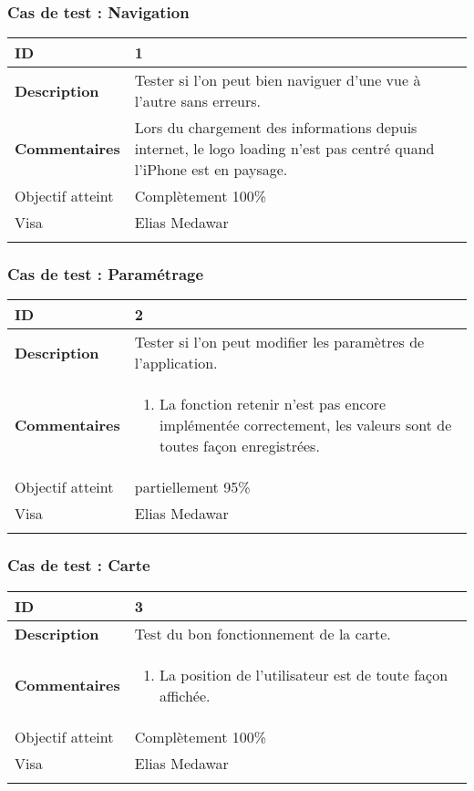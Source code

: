 		 		\subsubsection*{Cas de test : Navigation}
		 				 \begin{longtable}{m{4cm}|p{10cm}|}
		 				 \textbf{ ID} & 1 \\
		 				 \hline \textbf{Description} & Tester si l'on peut bien naviguer d'une vue à l'autre sans erreurs.\\
		 				 \hline \textbf{Commentaires} &Lors du chargement des informations depuis internet, le logo loading n'est pas centré quand l'iPhone		 est en paysage. \\
		 				 \hline Objectif  atteint & {\color{green} Complètement 100\% \CheckedBox } \\
		 				\hline Visa & Elias Medawar \\	
		 				 \\
		 			 \end{longtable} 
		  		\subsubsection*{Cas de test : Paramétrage}
		 		 \begin{longtable}{m{4cm}|p{10cm}|}
		 		 \textbf{ ID} & 2 \\
		 		 \hline \textbf{Description} & Tester si l'on peut modifier les paramètres de l'application.\\
		 		 \hline \textbf{Commentaires} & 
		 		 	 	 \begin{enumerate}
		 				  		\item La fonction retenir n'est pas encore implémentée correctement, les valeurs sont de toutes façon enregistrées.
		 				  	\end{enumerate} \\
		  				\hline Objectif atteint &  {\color{orange}partiellement 95\% \XBox} \\
		  				\hline Visa & Elias Medawar 	\\
		 		 \\
		 		  \end{longtable} 		 		 
		 		 \subsubsection*{Cas de test : Carte}
		 		 		 \begin{longtable}{m{4cm}|p{10cm}|}
		 		 		 \textbf{ ID} & 3 \\
		 		 		 \hline \textbf{Description} &  Test du bon fonctionnement de la carte.\\
		 		 		 \hline \textbf{Commentaires} &  
		 		 		 	 	 \begin{enumerate}
	 		 		 		 	 		\item La position de l'utilisateur est de toute façon affichée.
	 		 		 		 	\end{enumerate} \\
	 		 		 		  				\hline Objectif atteint & {\color{green} Complètement  100\% \CheckedBox } \\
	 		 		 		  				\hline Visa & Elias Medawar 	\\
		 		 		 \\
		 		 \end{longtable} 
